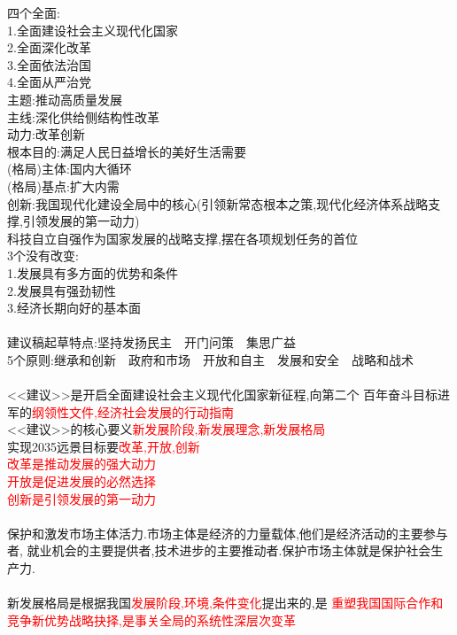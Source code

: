 \documentclass[UTF8]{article}
\begin{document}
    四个全面:\\
    1.全面建设社会主义现代化国家\\
    2.全面深化改革\\
    3.全面依法治国\\
    4.全面从严治党\\
    主题:推动高质量发展\\
    主线:深化供给侧结构性改革\\
    动力:改革创新\\
    根本目的:满足人民日益增长的美好生活需要\\
    (格局)主体:国内大循环\\
    (格局)基点:扩大内需\\
    创新:我国现代化建设全局中的核心(引领新常态根本之策,现代化经济体系战略支撑,引领发展的第一动力)\\
    科技自立自强作为国家发展的战略支撑,摆在各项规划任务的首位\\
    3个没有改变:\\
    1.发展具有多方面的优势和条件\\
    2.发展具有强劲韧性\\
    3.经济长期向好的基本面\\
    \\
    建议稿起草特点:坚持发扬民主\(\quad\)开门问策\(\quad\)集思广益\\
    5个原则:继承和创新\(\quad\)政府和市场\(\quad\)开放和自主\(\quad\)发展和安全\(\quad\)战略和战术\\
    \\
    <<建议>>是开启全面建设社会主义现代化国家新征程,向第二个
    百年奋斗目标进军的\textcolor{red}{纲领性文件,经济社会发展的行动指南}\\
    <<建议>>的核心要义\textcolor{red}{新发展阶段,新发展理念,新发展格局}\\
    实现2035远景目标要\textcolor{red}{改革,开放,创新}\\
    \textcolor{red}{改革是推动发展的强大动力}\\
    \textcolor{red}{开放是促进发展的必然选择}\\
    \textcolor{red}{创新是引领发展的第一动力}\\
    \\
    保护和激发市场主体活力.市场主体是经济的力量载体,他们是经济活动的主要参与者,
    就业机会的主要提供者,技术进步的主要推动者.保护市场主体就是保护社会生产力.\\
    \\
    新发展格局是根据我国\textcolor{red}{发展阶段,环境,条件变化}提出来的,是
    \textcolor{red}{重塑我国国际合作和竞争新优势战略抉择,是事关全局的系统性深层次变革}\\
    
\end{document}
